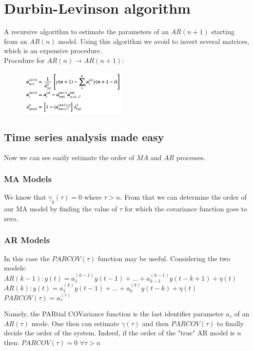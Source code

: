 \documentclass[10pt,a4paper]{article}
\begin{document}
\section{Durbin-Levinson algorithm}
A recursive algorithm to estimate the parameters of an $AR(n+1)$ starting from an $AR(n)$ model. Using this algorithm we avoid to invert several matrices, which is an expensive procedure. \\
Procedure for $AR(n) \rightarrow AR(n+1)$:
 \begin{figure}[h!]
 \hfill \includegraphics[width=150pt]{images/durbin.png}\hspace*{\fill}
  \label{fig:durbin}
\end{figure} 
\subsection{Time series analysis made easy}
Now we can see easily estimate the order of $MA$ and $AR$ processes.
\subsubsection{MA Models}
We know that $\gamma_y(\tau)=0$ where $\tau > n$. From that we can determine the order of our MA model by finding the value of $\tau$ for which the covariance function goes to zero.
\subsubsection{AR Models} 
In this case the $PARCOV(\tau)$ function may be useful. Considering the two models:
\center 
	$AR(k-1):y(t)=a_1^{(k-1)}y(t-1)+...+a_{k-1}^{(k-1)}y(t-k+1) + \eta(t)$ \\
	$AR(k):y(t)=a_1^{(k)}y(t-1)+...+a_{k}^{(k)}y(t-k) + \eta(t)$ \\
	$PARCOV(\tau)=a_\tau^{(\tau)}$ \\
	\raggedright \vspace{0.5em}
	Namely, the PARtial COVariance function is the last identifier parameter $a_\tau$ of an $AR(\tau)$ mode. One then can estimate $\gamma(\tau)$ and then $PARCOV(\tau)$ to finally decide the order of the system. Indeed, if the order of the "true" AR model is $n$ then:
	\center $PARCOV(\tau)=0$ $\forall \tau > n$
	\\ \raggedright
\end{document}
